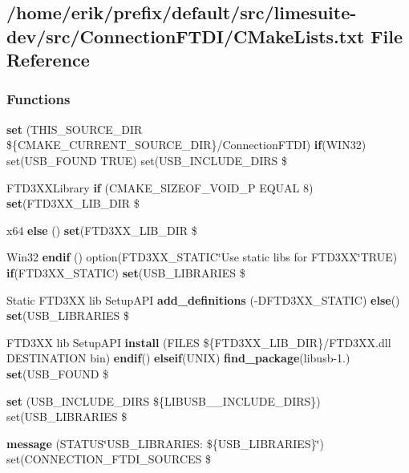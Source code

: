\subsection{/home/erik/prefix/default/src/limesuite-\/dev/src/\+Connection\+F\+T\+D\+I/\+C\+Make\+Lists.txt File Reference}
\label{src_2ConnectionFTDI_2CMakeLists_8txt}
\subsubsection*{Functions}
\begin{DoxyCompactItemize}
\item 
{\bf set} (T\+H\+I\+S\+\_\+\+S\+O\+U\+R\+C\+E\+\_\+\+D\+IR \$\{C\+M\+A\+K\+E\+\_\+\+C\+U\+R\+R\+E\+N\+T\+\_\+\+S\+O\+U\+R\+C\+E\+\_\+\+D\+IR\}/Connection\+F\+T\+DI) {\bf if}(W\+I\+N32) set(U\+S\+B\+\_\+\+F\+O\+U\+ND T\+R\+UE) set(U\+S\+B\+\_\+\+I\+N\+C\+L\+U\+D\+E\+\_\+\+D\+I\+RS \$
\item 
F\+T\+D3\+X\+X\+Library {\bf if} (C\+M\+A\+K\+E\+\_\+\+S\+I\+Z\+E\+O\+F\+\_\+\+V\+O\+I\+D\+\_\+P E\+Q\+U\+AL 8) {\bf set}(F\+T\+D3\+X\+X\+\_\+\+L\+I\+B\+\_\+\+D\+IR \$
\item 
x64 {\bf else} () {\bf set}(F\+T\+D3\+X\+X\+\_\+\+L\+I\+B\+\_\+\+D\+IR \$
\item 
Win32 {\bf endif} () option(F\+T\+D3\+X\+X\+\_\+\+S\+T\+A\+T\+IC\char`\"{}Use static libs for F\+T\+D3\+XX\char`\"{}T\+R\+UE) {\bf if}(F\+T\+D3\+X\+X\+\_\+\+S\+T\+A\+T\+IC) {\bf set}(U\+S\+B\+\_\+\+L\+I\+B\+R\+A\+R\+I\+ES \$
\item 
Static F\+T\+D3\+XX lib Setup\+A\+PI {\bf add\+\_\+definitions} (-\/D\+F\+T\+D3\+X\+X\+\_\+\+S\+T\+A\+T\+IC) {\bf else}() {\bf set}(U\+S\+B\+\_\+\+L\+I\+B\+R\+A\+R\+I\+ES \$
\item 
F\+T\+D3\+XX lib Setup\+A\+PI {\bf install} (F\+I\+L\+ES \$\{F\+T\+D3\+X\+X\+\_\+\+L\+I\+B\+\_\+\+D\+IR\}/F\+T\+D3\+X\+X.\+dll D\+E\+S\+T\+I\+N\+A\+T\+I\+ON bin) {\bf endif}() {\bf elseif}(U\+N\+IX) {\bf find\+\_\+package}(libusb-\/1.) {\bf set}(U\+S\+B\+\_\+\+F\+O\+U\+ND \$
\item 
{\bf set} (U\+S\+B\+\_\+\+I\+N\+C\+L\+U\+D\+E\+\_\+\+D\+I\+RS \$\{L\+I\+B\+U\+S\+B\+\_\+\_\+\+I\+N\+C\+L\+U\+D\+E\+\_\+\+D\+I\+RS\}) set(U\+S\+B\+\_\+\+L\+I\+B\+R\+A\+R\+I\+ES \$
\item 
{\bf message} (S\+T\+A\+T\+US\char`\"{}U\+S\+B\+\_\+\+L\+I\+B\+R\+A\+R\+I\+E\+S\+: \$\{U\+S\+B\+\_\+\+L\+I\+B\+R\+A\+R\+I\+ES\}\char`\"{}) set(C\+O\+N\+N\+E\+C\+T\+I\+O\+N\+\_\+\+F\+T\+D\+I\+\_\+\+S\+O\+U\+R\+C\+ES \$
\end{DoxyCompactItemize}



